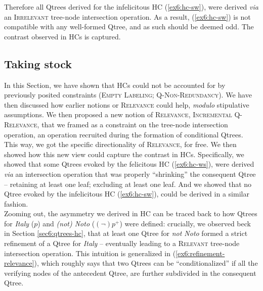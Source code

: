 Therefore all Qtrees derived for the infelicitous HC (\ref{ex6:hc-sw}), were derived \textit{via} an \textsc{Irrelevant} tree-node intersection operation. As a result, (\ref{ex6:hc-sw}) is not compatible with any well-formed Qtree, and as such should be deemed odd. The contrast observed in HCs is captured.

\subsection{Taking stock}

In this Section, we have shown that HCs could not be accounted for by previously posited constraints (\textsc{Empty Labeling}; \textsc{Q-Non-Redundancy}). We have then discussed how earlier notions or \textsc{Relevance} could help, \textit{modulo} stipulative assumptions. We then proposed a new notion of \textsc{Relevance}, \textsc{Incremental Q-Relevance}, that we framed as a constraint on the tree-node intersection operation, an operation recruited during the formation of conditional Qtrees. This way, we got the specific directionality of \textsc{Relevance}, for free. We then showed how this new view could capture the contrast in HCs. Specifically, we showed that some Qtrees evoked by the felicitous HC (\ref{ex6:hc-ws}), were derived \textit{via} an intersection operation that was properly ``shrinking'' the consequent Qtree -- retaining at least one leaf; excluding at least one leaf. And we showed that no Qtree evoked by the infelicitous HC (\ref{ex6:hc-sw}), could be derived in a similar fashion.\\

Zooming out, the asymmetry we derived in HC can be traced back to how Qtrees for \textit{Italy} ($p$) and \textit{(not) Noto} ($(\neg) p^+$) were defined: crucially, we observed beck in Section \ref{sec6:qtrees-hc}, that at least one Qtree for \textit{not Noto} formed a strict refinement of a Qtree for \textit{Italy} -- eventually leading to a \textsc{Relevant} tree-node intersection operation. This intuition is generalized in (\ref{ex6:refinement-relevance}), which roughly says that two Qtrees can be ``conditionalized'' if all the verifying nodes of the antecedent Qtree, are further subdivided in the consequent Qtree. 

